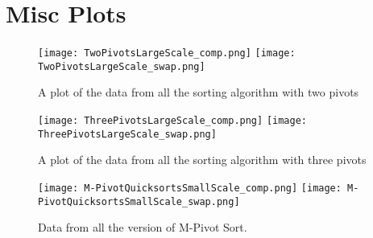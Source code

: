 \section{Misc Plots}
	\label{sec:MiscPlots}

	\begin{figure}[ht!]
		\begin{center}
			\texttt{[image: TwoPivotsLargeScale\_comp.png]}
			\texttt{[image: TwoPivotsLargeScale\_swap.png]}
			\caption{A plot of the data from all the sorting algorithm with two pivots}
		\label{fig:TwoPivot}
		\end{center}
	\end{figure}

	\begin{figure}[ht!]
		\begin{center}
			\texttt{[image: ThreePivotsLargeScale\_comp.png]}
			\texttt{[image: ThreePivotsLargeScale\_swap.png]}
			\caption{A plot of the data from all the sorting algorithm with three pivots}
			\label{fig:ThreePivot}
		\end{center}
	\end{figure}

	\begin{figure}[ht!]
		\begin{center}
			\texttt{[image: M-PivotQuicksortsSmallScale\_comp.png]}
			\texttt{[image: M-PivotQuicksortsSmallScale\_swap.png]}
			\caption{Data from all the version of M-Pivot Sort.}
			\label{fig:MPivot}
		\end{center}
	\end{figure}
